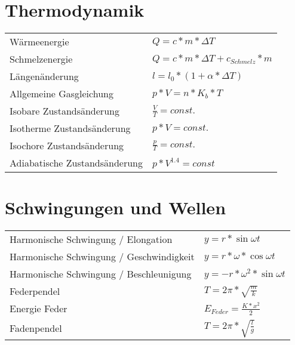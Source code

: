 \documentclass[12pt,a4paper]{paper}
\begin{document}
\section{Thermodynamik}
\begin{tabularx}{\textwidth}{X|X}
	Wärmeenergie & $Q=c*m*\Delta T$\\
	Schmelzenergie & $Q = c*m*\Delta T + c_{Schmelz} * m$\\
	Längenänderung & $l = l_0 * (1 + \alpha * \Delta T)$\\
	Allgemeine Gasgleichung & $p*V = n *K_b * T$\\
	Isobare Zustandsänderung & $\frac{V}{T} = const.$\\
	Isotherme Zustandsänderung & $p*V = const.$\\
	Isochore Zustandsänderung & $\frac{p}{T} = const.$\\
	Adiabatische Zustandsänderung & $p * V^{1.4} = const$
\end{tabularx}
\section{Schwingungen und Wellen}
\begin{tabularx}{\textwidth}{X|X}
Harmonische Schwingung / Elongation & $y = r * \sin{\omega t}$\\
Harmonische Schwingung / Geschwindigkeit & $y = r * \omega * \cos{\omega t}$\\
Harmonische Schwingung / Beschleunigung & $y = -r * \omega^2 * \sin{\omega t}$\\
Federpendel & $T = 2\pi * \sqrt{\frac{m}{k}}$\\
Energie Feder & $E_{Feder} = \frac{K * x^2}{2}$\\
Fadenpendel & $T= 2\pi * \sqrt{\frac{l}{g}}$\\
\end{tabularx}
\end{document}
